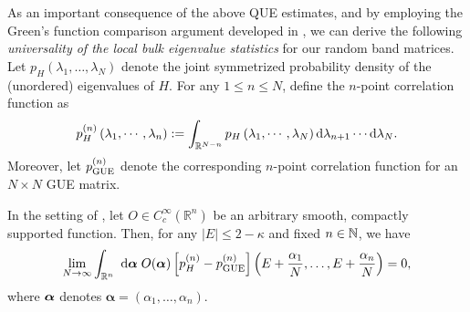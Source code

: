 \begin{theorem}
\end{theorem}

As an important consequence of the above QUE estimates, and by employing the Green's function comparison argument developed in \cite{Xu:2024aa}, we can derive the following \emph{universality of the local bulk eigenvalue statistics} for our random band matrices. 
Let $p_{H}(\lambda_1,\ldots, \lambda_{N})$ denote the joint symmetrized probability density of the (unordered) eigenvalues of $H$. For any $1\le n \le N$, define the $n$-point correlation function as
$$
p_{H}^{(n)}\left(\lambda_1, \cdots, \lambda_n\right)
:=\int_{\mathbb{R}^{N-n}} p_{H}\left(\lambda_1, \cdots, \lambda_{N}\right) \mathrm{d} \lambda_{n+1} \cdots \mathrm{d} \lambda_{N}.
$$
Moreover, let $p_{\rm{GUE}}^{(n)}$ denote the corresponding $n$-point correlation function for an $N\times N$ GUE matrix.

\begin{theorem}\label{Thm: B_Univ}
In the setting of , let $O \in C_c^{\infty}\left(\mathbb{R}^n\right)$ be an arbitrary smooth, compactly supported function. Then, for any $|E|\le 2-\kappa$ and fixed $n\in \mathbb{N}$, we have
\begin{equation}\label{eq:universality}
 \lim_{N\to \infty}	\int_{\mathbb{R}^n} \mathrm{~d} \boldsymbol{\alpha}\; O(\boldsymbol{\alpha}) \left[p_{H}^{(n)}-p_{\rm{GUE}}^{(n)}\right]\left(E+\frac{\alpha_1}{N  }, \ldots, E+\frac{\alpha_n}{N}\right)   =0, 
 \end{equation} 
where ${\boldsymbol{\alpha}}$ denotes $\boldsymbol{\alpha}=\left(\alpha_1, \ldots, \alpha_n\right)$. 
 \end{theorem}


